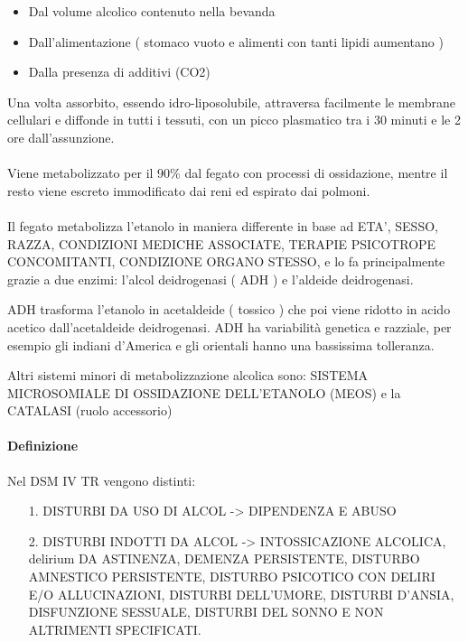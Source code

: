 \begin{itemize}
\item Dal volume alcolico contenuto nella bevanda
\item Dall'alimentazione ( stomaco vuoto e alimenti con tanti lipidi
aumentano )
\item Dalla presenza di additivi (CO2)
\end{itemize}

Una volta assorbito, essendo idro-liposolubile, attraversa facilmente le
membrane cellulari e diffonde in tutti i tessuti, con un picco
plasmatico tra i 30 minuti e le 2 ore dall'assunzione.
\\\\
Viene metabolizzato per il 90\% dal fegato con processi di ossidazione,
mentre il resto viene escreto immodificato dai reni ed espirato dai
polmoni.
\\\\
Il fegato metabolizza l'etanolo in maniera differente in base ad ETA',
SESSO, RAZZA, CONDIZIONI MEDICHE ASSOCIATE, TERAPIE PSICOTROPE
CONCOMITANTI, CONDIZIONE ORGANO STESSO, e lo fa principalmente grazie a
due enzimi: l'alcol deidrogenasi ( ADH ) e l'aldeide deidrogenasi.

ADH trasforma l'etanolo in acetaldeide ( tossico ) che poi viene ridotto
in acido acetico dall'acetaldeide deidrogenasi. ADH ha variabilità
genetica e razziale, per esempio gli indiani d'America e gli orientali
hanno una bassissima tolleranza.

Altri sistemi minori di metabolizzazione alcolica sono: SISTEMA
MICROSOMIALE DI OSSIDAZIONE DELL'ETANOLO (MEOS) e la CATALASI (ruolo
accessorio)

\paragraph{Definizione}

Nel DSM IV TR vengono distinti:

\begin{itemize}
\item[1.] DISTURBI DA USO DI ALCOL -> DIPENDENZA E ABUSO
\item[2.] DISTURBI INDOTTI DA ALCOL -> INTOSSICAZIONE ALCOLICA,
delirium DA ASTINENZA, DEMENZA PERSISTENTE, DISTURBO AMNESTICO
PERSISTENTE, DISTURBO PSICOTICO CON DELIRI E/O ALLUCINAZIONI, DISTURBI
DELL'UMORE, DISTURBI D'ANSIA, DISFUNZIONE SESSUALE, DISTURBI DEL SONNO E
NON ALTRIMENTI SPECIFICATI.
\end{itemize}

